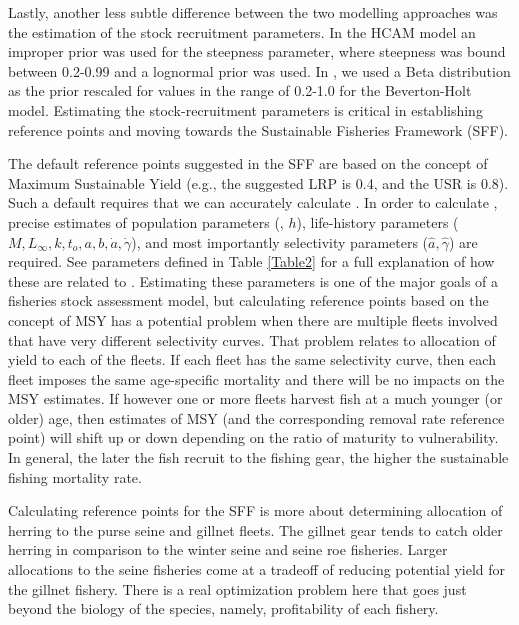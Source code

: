 Lastly, another less subtle difference between the two modelling approaches was the estimation of the stock recruitment parameters.  In the HCAM model an improper prior was used for the steepness parameter, where steepness was bound between 0.2-0.99 and a lognormal prior was used.  In \iscam, we used a Beta distribution as the prior rescaled for values in the range of 0.2-1.0 for the Beverton-Holt model.   Estimating the stock-recruitment parameters is critical in establishing reference points and moving towards the Sustainable Fisheries Framework (SFF). 

The default reference points suggested in the SFF are based on the concept of Maximum Sustainable Yield (e.g., the suggested LRP is 0.4\bmsy, and the USR is 0.8\bmsy).  Such a default requires that we can accurately calculate \bmsy.  In order to calculate \bmsy, precise estimates of population parameters (\bo, $h$), life-history parameters ($M,L_\infty,k,t_o,a,b,\dot{a},\dot{\gamma}$), and most importantly selectivity parameters ($\hat{a},\hat{\gamma}$) are required. See parameters defined in Table \ref{Table2} for a full explanation of how these are related to \bmsy.  Estimating these parameters is one of the major goals of a fisheries stock assessment model, but calculating reference points based on the concept of MSY has a potential problem when there are multiple fleets involved that have very different selectivity curves. That problem relates to allocation of yield to each of the fleets.  If each fleet has the same selectivity curve, then each fleet imposes the same age-specific mortality and there will be no impacts on the MSY estimates.  If however one or more fleets harvest fish at a much younger (or older) age, then estimates of MSY (and the corresponding removal rate reference point) will shift up or down depending on the ratio of maturity to vulnerability.  In general, the later the fish recruit to the fishing gear, the higher the sustainable fishing mortality rate.  

Calculating reference points for the SFF is more about determining allocation of herring to the purse seine and gillnet fleets.  The gillnet gear tends to catch older herring in comparison to the winter seine and seine roe fisheries.  Larger allocations to the seine fisheries come at a tradeoff of reducing potential yield for the gillnet fishery.  There is a real optimization problem here that goes just beyond the biology of the species, namely, profitability of each fishery. 




